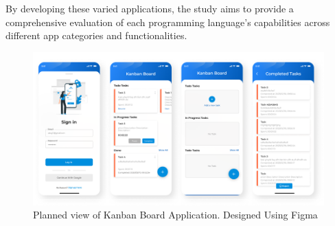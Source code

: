 By developing these varied applications, the study aims to provide a comprehensive evaluation of each programming language's capabilities across different app categories and functionalities.
\begin{figure}[htbp]
    \centering
    \includegraphics[scale = 0.85]{img/kanban_board.png}
    \caption{Planned view of Kanban Board Application. Designed Using Figma}
    \label{fig:kanban_board}
\end{figure}

